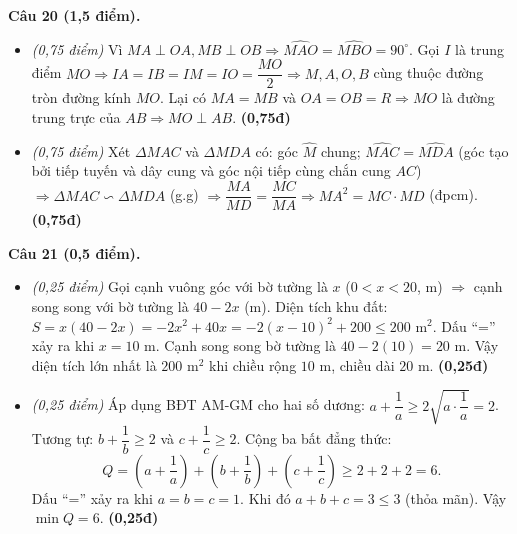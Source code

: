 \documentclass[11pt,a4paper]{article}
\begin{document}
\vspace{1mm}
\textbf{Câu 20 (1,5 điểm).}
\begin{itemize}
  \item[a)] \textit{(0,75 điểm)} Vì $MA \perp OA, MB \perp OB \Rightarrow \widehat{MAO} = \widehat{MBO} = 90^\circ$. Gọi $I$ là trung điểm $MO \Rightarrow IA = IB = IM = IO = \dfrac{MO}{2} \Rightarrow M, A, O, B$ cùng thuộc đường tròn đường kính $MO$. Lại có $MA = MB$ và $OA = OB = R \Rightarrow MO$ là đường trung trực của $AB \Rightarrow MO \perp AB$. \hfill \textbf{(0,75đ)}
  \item[b)] \textit{(0,75 điểm)} Xét $\Delta MAC$ và $\Delta MDA$ có: góc $\widehat{M}$ chung; $\widehat{MAC} = \widehat{MDA}$ (góc tạo bởi tiếp tuyến và dây cung và góc nội tiếp cùng chắn cung $AC$) $\Rightarrow \Delta MAC \backsim \Delta MDA$ (g.g) $\Rightarrow \dfrac{MA}{MD} = \dfrac{MC}{MA} \Rightarrow MA^2 = MC \cdot MD$ (đpcm). \hfill \textbf{(0,75đ)}
\end{itemize}

\vspace{1mm}
\textbf{Câu 21 (0,5 điểm).}
\begin{itemize}
  \item[a)] \textit{(0,25 điểm)} Gọi cạnh vuông góc với bờ tường là $x$ ($0 < x < 20$, m) $\Rightarrow$ cạnh song song với bờ tường là $40 - 2x$ (m). Diện tích khu đất: $S = x(40 - 2x) = -2x^2 + 40x = -2(x - 10)^2 + 200 \le 200\text{ m}^2$. Dấu ``='' xảy ra khi $x = 10\text{ m}$. Cạnh song song bờ tường là $40 - 2(10) = 20\text{ m}$. Vậy diện tích lớn nhất là $200\text{ m}^2$ khi chiều rộng $10\text{ m}$, chiều dài $20\text{ m}$. \hfill \textbf{(0,25đ)}
  \item[b)] \textit{(0,25 điểm)} Áp dụng BĐT AM-GM cho hai số dương: $a + \dfrac{1}{a} \ge 2\sqrt{a \cdot \dfrac{1}{a}} = 2$. Tương tự: $b + \dfrac{1}{b} \ge 2$ và $c + \dfrac{1}{c} \ge 2$. Cộng ba bất đẳng thức:
  \[
  Q = \left(a + \dfrac{1}{a}\right) + \left(b + \dfrac{1}{b}\right) + \left(c + \dfrac{1}{c}\right) \ge 2 + 2 + 2 = 6.
  \]
  Dấu ``='' xảy ra khi $a = b = c = 1$. Khi đó $a + b + c = 3 \le 3$ (thỏa mãn). Vậy $\min Q = 6$. \hfill \textbf{(0,25đ)}
\end{itemize}
\end{document}
